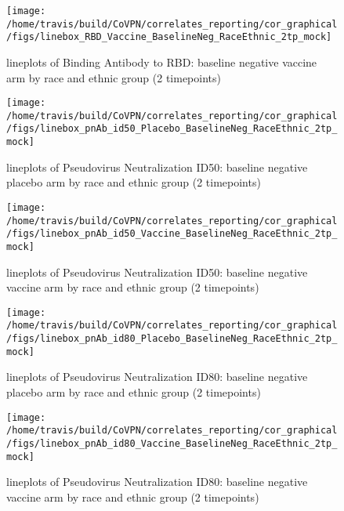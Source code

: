 \documentclass[]{book}
\theoremstyle{definition}
\theoremstyle{definition}
\theoremstyle{definition}
\newcommand{\1}{\mathbbm{1}}
\begin{document}
\clearpage
\begin{figure}[H]

{\centering \texttt{[image: /home/travis/build/CoVPN/correlates\_reporting/cor\_graphical/figs/linebox\_RBD\_Vaccine\_BaselineNeg\_RaceEthnic\_2tp\_mock]} 

}

\caption{lineplots of Binding Antibody to RBD: baseline negative vaccine arm by race and ethnic group (2 timepoints)}\label{fig:unnamed-chunk-190}
\end{figure}

\clearpage
\begin{figure}[H]

{\centering \texttt{[image: /home/travis/build/CoVPN/correlates\_reporting/cor\_graphical/figs/linebox\_pnAb\_id50\_Placebo\_BaselineNeg\_RaceEthnic\_2tp\_mock]} 

}

\caption{lineplots of Pseudovirus Neutralization ID50: baseline negative placebo arm by race and ethnic group (2 timepoints)}\label{fig:unnamed-chunk-191}
\end{figure}

\clearpage
\begin{figure}[H]

{\centering \texttt{[image: /home/travis/build/CoVPN/correlates\_reporting/cor\_graphical/figs/linebox\_pnAb\_id50\_Vaccine\_BaselineNeg\_RaceEthnic\_2tp\_mock]} 

}

\caption{lineplots of Pseudovirus Neutralization ID50: baseline negative vaccine arm by race and ethnic group (2 timepoints)}\label{fig:unnamed-chunk-192}
\end{figure}

\clearpage
\begin{figure}[H]

{\centering \texttt{[image: /home/travis/build/CoVPN/correlates\_reporting/cor\_graphical/figs/linebox\_pnAb\_id80\_Placebo\_BaselineNeg\_RaceEthnic\_2tp\_mock]} 

}

\caption{lineplots of Pseudovirus Neutralization ID80: baseline negative placebo arm by race and ethnic group (2 timepoints)}\label{fig:unnamed-chunk-193}
\end{figure}

\clearpage
\begin{figure}[H]

{\centering \texttt{[image: /home/travis/build/CoVPN/correlates\_reporting/cor\_graphical/figs/linebox\_pnAb\_id80\_Vaccine\_BaselineNeg\_RaceEthnic\_2tp\_mock]} 

}

\caption{lineplots of Pseudovirus Neutralization ID80: baseline negative vaccine arm by race and ethnic group (2 timepoints)}\label{fig:unnamed-chunk-194}
\end{figure}
\end{document}
